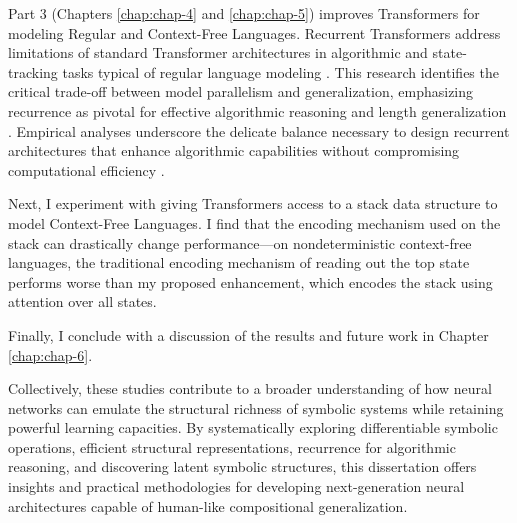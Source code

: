 Part 3 (Chapters \ref{chap:chap-4} and \ref{chap:chap-5}) improves Transformers for modeling Regular and Context-Free Languages. Recurrent Transformers address limitations of standard Transformer architectures in algorithmic and state-tracking tasks typical of regular language modeling \citep{deletang_neural_2022, merrill2024the}. This research identifies the critical trade-off between model parallelism and generalization, emphasizing recurrence as pivotal for effective algorithmic reasoning and length generalization \citep{soulos2024recurrent}. Empirical analyses underscore the delicate balance necessary to design recurrent architectures that enhance algorithmic capabilities without compromising computational efficiency \cite{ju_staircase_2022, hutchins_block-recurrent_2022}.

Next, I experiment with giving Transformers access to a stack data structure to model Context-Free Languages. I find that the encoding mechanism used on the stack can drastically change performance—on nondeterministic context-free languages, the traditional encoding mechanism of reading out the top state performs worse than my proposed enhancement, which encodes the stack using attention over all states.

Finally, I conclude with a discussion of the results and future work in Chapter \ref{chap:chap-6}. 

Collectively, these studies contribute to a broader understanding of how neural networks can emulate the structural richness of symbolic systems while retaining powerful learning capacities. By systematically exploring differentiable symbolic operations, efficient structural representations, recurrence for algorithmic reasoning, and discovering latent symbolic structures, this dissertation offers insights and practical methodologies for developing next-generation neural architectures capable of human-like compositional generalization.